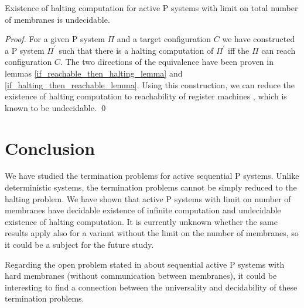\documentclass[llncs,submission,copyright,creativecommons]{../lib/lncs/llncs}
\begin{document}
\begin{theorem}
\label{existence_of_halting_theorem}
  Existence of halting computation for active P systems with limit on total number of membranes is undecidable.
\end{theorem}

\begin{proof}
  For a given P system $\Pi$ and a target configuration $C$ we have constructed a P system $\Pi^\prime$ such that there is a halting computation of $\Pi^\prime$ iff the $\Pi$ can reach configuration $C$. The two directions of the equivalence have been proven in lemmas \ref{if_reachable_then_halting_lemma} and \ref{if_halting_then_reachable_lemma}. Using this construction, we can reduce the existence of halting computation to reachability of register machines \cite{Ibarra05Active}, which is known to be undecidable. \qed
\end{proof}



\section{Conclusion}
\label{sec:conclusion}
We have studied the termination problems for active sequential P systems. Unlike deterministic systems, the termination problems cannot be simply reduced to the halting problem. We have shown that active P systems with limit on number of membranes have decidable existence of infinite computation and undecidable existence of halting computation. It is currently unknown whether the same results apply also for a variant without the limit on the number of membranes, so it could be a subject for the future study.

Regarding the open problem stated in \cite{Ibarra05Active} about sequential active P systems with hard membranes (without communication between membranes), it could be interesting to find a connection between the universality and decidability of these termination problems.


\end{document}
